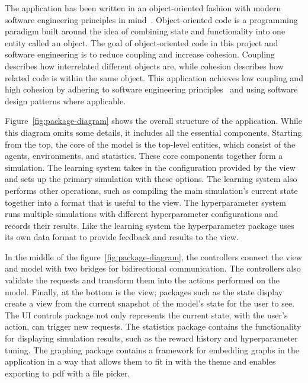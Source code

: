 \documentclass[]{final_report}
\begin{document}
The application has been written in an object-oriented fashion with modern software engineering principles in mind~\cite{van2008software}. Object-oriented code is a programming paradigm built around the idea of combining state and functionality into one entity called an object. The goal of object-oriented code in this project and software engineering is to reduce coupling and increase cohesion. Coupling describes how interrelated different objects are, while cohesion describes how related code is within the same object. This application achieves low coupling and high cohesion by adhering to software engineering principles~\cite{softwareEngineringPrinciples} and using software design patterns where applicable.

Figure~\ref{fig:package-diagram} shows the overall structure of the application. While this diagram omits some details, it includes all the essential components. Starting from the top, the core of the model is the top-level entities, which consist of the agents, environments, and statistics. These core components together form a simulation. The learning system takes in the configuration provided by the view and sets up the primary simulation with these options. The learning system also performs other operations, such as compiling the main simulation's current state together into a format that is useful to the view. The hyperparameter system runs multiple simulations with different hyperparameter configurations and records their results. Like the learning system the hyperparameter package uses its own data format to provide feedback and results to the view.

In the middle of the figure~\ref{fig:package-diagram}, the controllers connect the view and model with two bridges for bidirectional communication. The controllers also validate the requests and transform them into the actions performed on the model. Finally, at the bottom is the view; packages such as the state display create a view from the current snapshot of the model's state for the user to see. The UI controls package not only represents the current state, with the user's action, can trigger new requests. The statistics package contains the functionality for displaying simulation results, such as the reward history and hyperparameter tuning. The graphing package contains a framework for embedding graphs in the application in a way that allows them to fit in with the theme and enables exporting to pdf with a file picker.
\end{document}
